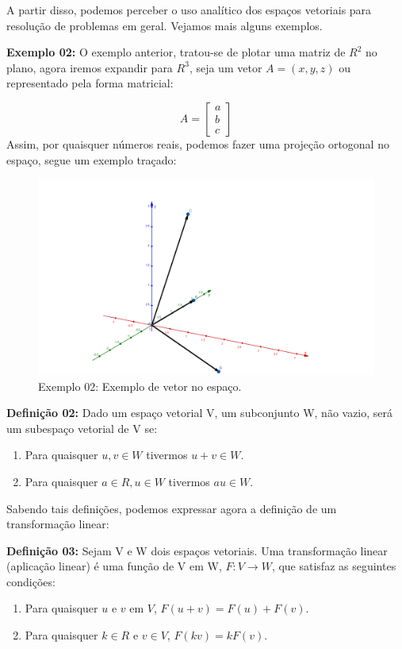 A partir disso, podemos perceber o uso analítico dos espaços vetoriais para resolução de problemas em geral. Vejamos mais alguns exemplos.

\noindent\textbf{Exemplo 02:} O exemplo anterior, tratou-se de plotar uma matriz de $R^2$ no plano, agora iremos expandir para $R^3$, seja um vetor $A = (x, y, z)$ ou representado pela forma matricial:

\[
A = \begin{bmatrix}
	a \\ b \\ c
\end{bmatrix}
\]
\noindent Assim, por quaisquer números reais, podemos fazer uma projeção ortogonal no espaço, segue um exemplo traçado:

\begin{figure}
	\centering
	\includegraphics[width=1.0\textwidth]{exemplo02.png}
	\caption{Exemplo 02: Exemplo de vetor no espaço.}
\end{figure}

\noindent\textbf{Definição 02:} Dado um espaço vetorial V, um subconjunto W, não vazio, será um subespaço vetorial de V se:
\begin{enumerate}
	\item Para quaisquer $u, v \in W$ tivermos $u + v \in W$.
	\item Para quaisquer $a \in R, u \in W$ tivermos $au \in W$.
	\end{enumerate}


Sabendo tais definições, podemos expressar agora a definição de um transformação linear:

\noindent\textbf{Definição 03:} Sejam V e W dois espaços vetoriais. Uma transformação linear (aplicação linear) é uma função de V em W, $F:V \rightarrow W$, que satisfaz as seguintes condições:
\begin{enumerate}
	\item Para quaisquer $u$ e $v$ em $V$, $F(u + v) = F(u) + F(v)$.
	\item Para quaisquer $k \in R$ e $v \in V$, $F(kv) = kF(v)$.
\end{enumerate}	

